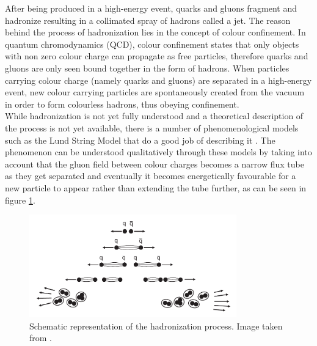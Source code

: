 \documentclass[main]{subfiles} %
\begin{document}


\doublespacing


\label{sect:jets_algorithms}
\vspace{20pt}

After being produced in a high-energy event, quarks and gluons fragment and hadronize resulting in a collimated spray of hadrons called a jet. The reason behind the process of hadronization lies in the concept of colour confinement. In quantum chromodynamics (QCD), colour confinement states that only objects with non zero colour charge can propagate as free particles, therefore quarks and gluons are only seen bound together in the form of hadrons. When particles carrying colour charge (namely quarks and gluons) are separated in a high-energy event, new colour carrying particles are spontaneously created from the vacuum in order to form colourless hadrons, thus obeying confinement. \\

While hadronization is not yet fully understood and a theoretical description of the process is not yet available, there is a number of phenomenological models such as the Lund String Model that do a good job of describing it \cite{Andersson1983}. The phenomenon can be understood qualitatively through these models by taking into account that the gluon field between colour charges becomes a narrow flux tube as they get separated and eventually it becomes energetically favourable for a new particle to appear rather than extending the tube further, as can be seen in figure \ref{fig:hadronization}.\\

\begin{figure}[h]
    \centering
    \includegraphics[width=0.8\textwidth]{../Figures/Theory/hadronization.png}
    \caption{Schematic representation of the hadronization process. Image taken from \cite{Thomson2013}.}
    \label{fig:hadronization}
\end{figure}
\end{document}
